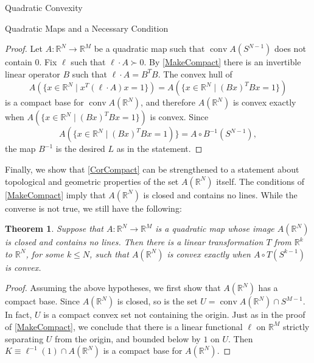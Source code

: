 \documentclass[12pt,oneside,final]{ucthesisucsbmath2010}
\newcommand{\R}{\mathbb{R}}
\DeclareMathOperator{\conv}{conv}
\newtheorem{thm}{Theorem}[section]
\theoremstyle{definition}
\begin{document}
\begin{chapter}{Quadratic Convexity}
\begin{section}{Quadratic Maps and a Necessary Condition}
\begin{proof} Let $A : \R^N \to \R^M$ be a quadratic map such that $\conv A(S^{N-1})$ does not contain $0$. Fix $\ell$ such that $\ell \cdot A \succ 0$. By \ref{MakeCompact} there is an invertible linear operator $B$ such that $\ell \cdot A = B^TB$. The convex hull of 
\[A(\{x \in \R^N \mid x^T(\ell \cdot A)x = 1\})=A(\{x \in \R^N \mid (Bx)^TBx = 1\})\]
is a compact base for $\conv A(\R^N)$, and therefore $A(\R^N)$ is convex exactly when $A(\{x \in \R^N \mid (Bx)^TBx = 1\})$ is convex. Since
\[A(\{x \in \R^N \mid (Bx)^TBx = 1)\}=A\circ B^{-1}(S^{N-1}),\]
 the map $B^{-1}$ is the desired $L$ as in the statement.
\end{proof}

Finally, we show that \ref{CorCompact} can be strengthened to a statement about topological and geometric properties of the set $A(\R^N)$ itself. The conditions of \ref{MakeCompact} imply that $A(\R^N)$ is closed and contains no lines. While the converse is not true, we still have the following:

\begin{thm} Suppose that $A: \R^N \to \R^M$ is a quadratic map whose image $A(\R^N)$ is closed and contains no lines. Then there is a linear transformation $T$ from $\R^k$ to $\R^N$, for some $k \leq N$, such that $A(\R^N)$ is convex exactly when $A\circ T(S^{k-1})$ is convex.
\end{thm}
\begin{proof}Assuming the above hypotheses, we first show that $A(\R^N)$ has a compact base. Since $A(\R^N)$ is closed, so is the set $U = \conv A(\R^N)\cap S^{M-1}$. In fact, $U$ is a compact convex set not containing the origin. Just as in the proof of \ref{MakeCompact}, we conclude that there is a linear functional $\ell$ on $\R^M$ strictly separating $U$ from the origin, and bounded below by $1$ on $U$. Then $K\equiv \ell^{-1}(1)\cap A(\R^N)$ is a compact base for $A(\R^N)$.


\end{proof}
\end{section}
\end{chapter}
\end{document}
